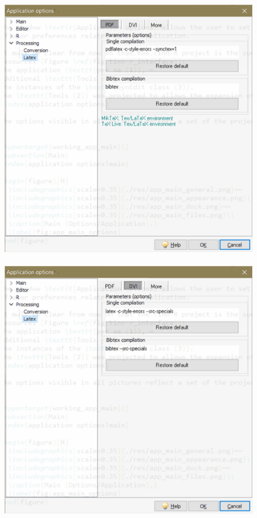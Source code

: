 \begin{figure}[h!]
  \includegraphics[scale=0.45]{./res/app_processing_latex_pdf.png}~~
  \includegraphics[scale=0.45]{./res/app_processing_latex_dvi.png}~~

\end{figure}

